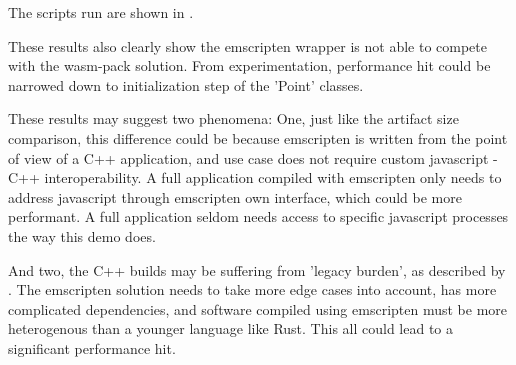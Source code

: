 The scripts run are shown in .

These results also clearly show the emscripten wrapper is not able to compete with the wasm-pack solution.
From experimentation, performance hit could be narrowed down to initialization step of the 'Point' classes. 

These results may suggest two phenomena:
One, just like the artifact size comparison, this difference could be because emscripten is written from the point of view of a C++ application, and use case does not require custom javascript - C++ interoperability. 
A full application compiled with emscripten only needs to address javascript through emscripten own interface, which could be more performant. 
A full application seldom needs access to specific javascript processes the way this demo does. 

And two, the C++ builds may be suffering from 'legacy burden', as described by \citet{ammann_maplibre-rs_2022}. 
The emscripten solution needs to take more edge cases into account, has more complicated dependencies, and software compiled using emscripten must be more heterogenous than a younger language like Rust.
This all could lead to a significant performance hit.

